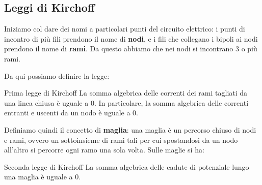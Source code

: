 \documentclass[a4paper,11pt]{article}
\begin{document}
\subsection{Leggi di Kirchoff}
Iniziamo col dare dei nomi a particolari punti del circuito elettrico: i punti di incontro di più fili prendono il nome di \textbf{nodi}, e i fili che collegano i bipoli ai nodi prendono il nome di \textbf{rami}.
Da questo abbiamo che nei nodi si incontrano 3 o più rami.

Da qui possiamo definire la legge:
\begin{theorem}{Prima legge di Kirchoff}
		La somma algebrica delle correnti dei rami tagliati da una linea chiusa è uguale a 0.
		In particolare, la somma algebrica delle correnti entranti e uscenti da un nodo è uguale a 0.
\end{theorem}

Definiamo quindi il concetto di \textbf{maglia}: una maglia è un percorso chiuso di nodi e rami, ovvero un sottoinsieme di rami tali per cui spostandosi da un nodo all'altro si percorre ogni ramo una sola volta.
Sulle maglie si ha:

\begin{theorem}{Seconda legge di Kirchoff}
	La somma algebrica delle cadute di potenziale lungo una maglia è uguale a 0.
\end{theorem}
\end{document}
